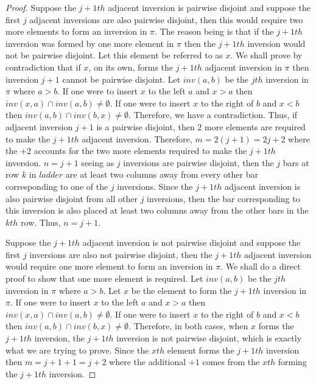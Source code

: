 \begin{proof}
    Suppose the $j+1th$ adjacent inversion is pairwise disjoint and suppose the first $j$ adjacent inversions are also 
    pairwise disjoint, then this would require two more elements to form an 
    inversion in $\pi$. The reason being is that if the $j+1th$ inversion was formed by one more element in $\pi$ then 
    the $j+1th$ inversion would not be pairwise disjoint. Let this element be referred to as $x$. We shall prove by contradiction 
    that if $x$, on its own, forms the $j+1th$ adjacent inversion in $\pi$ then inversion $j+1$ cannot be pairwise disjoint. Let $inv(a,b)$ 
    be the $jth$ inversion in $\pi$ where $a>b$. If one were to insert $x$
    to the left $a$ and $x>a$ then $inv(x,a) \cap inv(a,b) \neq \emptyset$. If one were to insert $x$ to the right of $b$ and 
    $x<b$ then $inv(a,b) \cap inv(b,x) \neq \emptyset$. Therefore, we have a contradiction. Thus, if adjacent inversion $j+1$ 
    is a pairwise disjoint, then $2$ more 
    elements are required to make the $j+1th$ adjacent inversion. Therefore, $m=2(j+1)=2j+2$ where the $+2$ accounts for the 
    two more elements required to make the $j+1th$ inversion. $n=j+1$ seeing as $j$ inversions are pairwise disjoint, then the $j$ bars 
    at row $k$ in $ladder$ are at least two columns away from every other bar corresponding 
    to one of the $j$ inversions. Since the $j+1th$ adjacent inversion is also pairwise disjoint from all other $j$ inversions, 
    then the bar corresponding to this inversion is 
    also placed at least two columns away from the other bars in the $kth$ row. Thus, $n=j+1$.\par 


    Suppose the $j+1th$ adjacent inversion is not pairwise disjoint and suppose the first $j$ inversions 
    are also not pairwise disjoint, then the $j+1th$ adjacent inversion would require one more element to form an inversion 
    in $\pi$. We shall do a direct proof to show that one more element is required. Let $inv(a,b)$ be the $jth$ inversion 
    in $\pi$ where $a>b$. Let $x$ be the element to form the $j+1th$ inversion in $\pi$. If one were to insert $x$
    to the left $a$ and $x>a$ then $inv(x,a) \cap inv(a,b) \neq \emptyset$.  If one were to insert $x$ to the right of $b$ and 
    $x<b$ then $inv(a,b) \cap inv(b,x) \neq \emptyset$. Therefore, in both cases, when $x$ forms the $j+1th$ inversion, 
    the $j+1th$ inversion is not pairwise disjoint, which is exactly what we are trying to prove. Since the $xth$ element 
    forms the $j+1th$ inversion then $m=j+1+1=j+2$ where the additional $+1$ comes from the $xth$ forming the $j+1th$ inversion.\par 


\end{proof}
